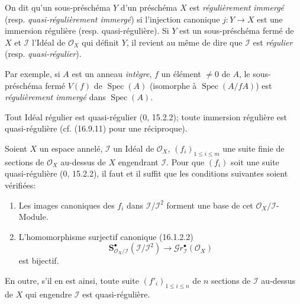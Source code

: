 On dit qu'un sous-préschéma $Y$ d'un préschéma $X$ est \emph{régulièrement
immergé} (resp. \emph{quasi-régulièrement immergé}) si l'injection canonique
$j:Y\to X$ est une immersion régulière (resp. quasi-régulière). Si $Y$ est un
sous-préschéma fermé de $X$ et $\mathscr{I}$ l'Idéal de $\mathcal{O}_X$ qui
définit $Y$, il revient au même de dire que $\mathscr{I}$ est \emph{régulier}
(resp. \emph{quasi-régulier}).

Par exemple, si $A$ est un anneau \emph{intègre}, $f$ un élément $\neq0$ de
$A$, le sous-préschéma fermé $V(f)$ de $\operatorname{Spec}(A)$ (isomorphe à
$\operatorname{Spec}(A/fA)$) est \emph{régulièrement immergé} dans
$\operatorname{Spec}(A)$.

Tout Idéal régulier est quasi-régulier (0, 15.2.2); toute immersion régulière
est quasi-régulière (cf. (16.9.11) pour une réciproque).

\begin{proposition}[16.9.3]
\label{IV.16.9.3}
Soient $X$ un espace annelé, $\mathscr{I}$ un Idéal de $\mathcal{O}_X$,
$(f_i)_{1\leq i\leq m}$ une suite finie de sections de $\mathcal{O}_X$
au-dessus de $X$ engendrant $\mathscr{I}$. Pour que $(f_i)$ soit une suite
quasi-régulière (0, 15.2.2), il faut et il suffit que les conditions suivantes
soient vérifiées:
\begin{enumerate}
  \item[(i)] Les images canoniques des $f_i$ dans
  $\mathscr{I}/\mathscr{I}^2$ forment une base de cet
  $\mathcal{O}_X/\mathscr{I}$-Module.
  \item[(ii)] L'homomorphisme surjectif canonique (16.1.2.2)
  \[
    \mathbf{S}_{\mathcal{O}_X/\mathscr{I}}^{\bullet}
    (\mathscr{I}/\mathscr{I}^2)
    \longrightarrow\mathscr{G}r_{\mathscr{I}}^{\bullet}(\mathcal{O}_X)
  \]
  est bijectif.
\end{enumerate}
En outre, s'il en est ainsi, toute suite $(f'_i)_{1\leq i\leq n}$ de $n$
sections de $\mathscr{I}$ au-dessus de $X$ qui engendre $\mathscr{I}$ est
quasi-régulière.
\end{proposition}

